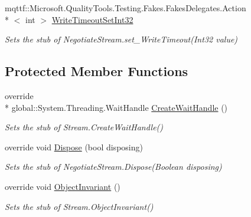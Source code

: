 \begin{DoxyCompactItemize}
mqttf\-::\-Microsoft.\-Quality\-Tools.\-Testing.\-Fakes.\-Fakes\-Delegates.\-Action\\*
$<$ int $>$ \hyperlink{class_system_1_1_net_1_1_security_1_1_fakes_1_1_stub_negotiate_stream_a5fb08c9b4b6f896b66b26df2dd0cc5f5}{Write\-Timeout\-Set\-Int32}
\begin{DoxyCompactList}\small\item\em Sets the stub of Negotiate\-Stream.\-set\-\_\-\-Write\-Timeout(\-Int32 value)\end{DoxyCompactList}\end{DoxyCompactItemize}
\subsection*{Protected Member Functions}
\begin{DoxyCompactItemize}
\item 
override \\*
global\-::\-System.\-Threading.\-Wait\-Handle \hyperlink{class_system_1_1_net_1_1_security_1_1_fakes_1_1_stub_negotiate_stream_a43150271b87d2b7d3c52a39f18ec987c}{Create\-Wait\-Handle} ()
\begin{DoxyCompactList}\small\item\em Sets the stub of Stream.\-Create\-Wait\-Handle()\end{DoxyCompactList}\item 
override void \hyperlink{class_system_1_1_net_1_1_security_1_1_fakes_1_1_stub_negotiate_stream_ae3d5481d75678bb6d1f9be4eba1f4699}{Dispose} (bool disposing)
\begin{DoxyCompactList}\small\item\em Sets the stub of Negotiate\-Stream.\-Dispose(\-Boolean disposing)\end{DoxyCompactList}\item 
override void \hyperlink{class_system_1_1_net_1_1_security_1_1_fakes_1_1_stub_negotiate_stream_a60b3641f8b777e169f4e1e8ccd097db4}{Object\-Invariant} ()
\begin{DoxyCompactList}\small\item\em Sets the stub of Stream.\-Object\-Invariant()\end{DoxyCompactList}\end{DoxyCompactItemize}
